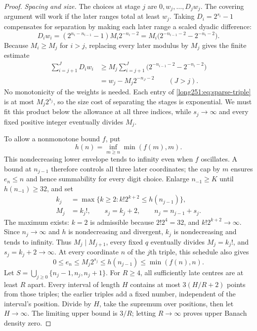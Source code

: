 \begin{proof}
\par\medskip\noindent\emph{Spacing and size.}
The choices at stage $j$ are $0,w_j,\ldots,D_jw_j$.
The covering argument will work if the later ranges total at least
$w_j$.  Taking $D_i=2^{s_i}-1$ compensates for separation by making
each later range a scaled dyadic difference:
\[
 D_iw_i=(2^{n_i-n_{i-1}}-1)M_i2^{-n_i-2}
       =M_i\bigl(2^{-n_{i-1}-2}-2^{-n_i-2}\bigr).
\]
Because $M_i\ge M_j$ for $i>j$, replacing every later modulus by $M_j$
gives the finite estimate
\begin{equation}\label{long251:eq:finite-overlap}
 \begin{aligned}
 \sum_{i=j+1}^{J}D_iw_i
 &\ge M_j\sum_{i=j+1}^{J}
       \bigl(2^{-n_{i-1}-2}-2^{-n_i-2}\bigr)\\
 &=w_j-M_j2^{-n_J-2}\qquad(J>j).
 \end{aligned}
\end{equation}
No monotonicity of the weights is needed.  Each entry of
\eqref{long251:eq:sparse-triple} is at most $M_j2^{s_j}$, so the size cost of
separating the stages is exponential.  We must fit this product below
the allowance at all three indices, while $s_j\to\infty$ and every
fixed positive integer eventually divides $M_j$.

To allow a nonmonotone bound $f$, put
\[
 h(n)=\inf_{m\ge n}\min(f(m),m).
\]
This nondecreasing lower envelope tends to infinity even when $f$
oscillates.  A bound at $n_{j-1}$ therefore controls all three later
coordinates; the cap by $m$ ensures $e_n\le n$ and hence summability
for every digit choice.
Enlarge $n_{-1}\ge K$ until $h(n_{-1})\ge32$, and set
\begin{equation}\label{long251:eq:sparse-general-schedule}
 \begin{split}
 k_j&=\max\{k\ge2:k!2^{k+2}\le h(n_{j-1})\},\\
 M_j&=k_j!,\qquad s_j=k_j+2,\qquad n_j=n_{j-1}+s_j.
 \end{split}
\end{equation}
The maximum exists: $k=2$ is admissible because $2!2^4=32$, and
$k!2^{k+2}\to\infty$.  Since $n_j\to\infty$ and $h$ is nondecreasing
and divergent, $k_j$ is nondecreasing and tends to infinity.  Thus
$M_j\mid M_{j+1}$, every fixed $q$ eventually divides $M_j=k_j!$,
and $s_j=k_j+2\to\infty$.
At every coordinate $n$ of the $j$th triple, this schedule also gives
\[
 0\le e_n\le M_j2^{s_j}\le h(n_{j-1})\le\min(f(n),n).
\]
Let $S=\bigcup_{j\ge0}\{n_j-1,n_j,n_j+1\}$.  For $R\ge4$, all
sufficiently late centres are at least $R$ apart.  Every interval of
length $H$ contains at most $3(H/R+2)$ points from those triples;
the earlier triples add a fixed number, independent of the interval's
position.  Divide by $H$, take the supremum over positions, then let
$H\to\infty$.  The limiting upper bound is $3/R$; letting $R\to\infty$
proves upper Banach density zero.


\end{proof}
